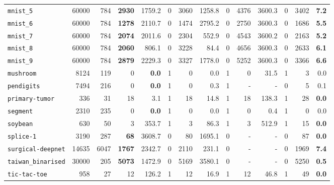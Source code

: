 \begin{tabular}{lccrrrrrrrrrrr}
\texttt{mnist\_5} & \multicolumn{1}{r}{60000} & \multicolumn{1}{r}{784}  & \textbf{2930} & 1759.2 & 0 & 3060 & 1258.8 & 0 & 4376 & 3600.3 & 0 & 3402 & \textbf{7.2}\\
\texttt{mnist\_6} & \multicolumn{1}{r}{60000} & \multicolumn{1}{r}{784}  & \textbf{1278} & 2110.7 & 0 & 1474 & 2795.2 & 0 & 2750 & 3600.3 & 0 & 1686 & \textbf{5.5}\\
\texttt{mnist\_7} & \multicolumn{1}{r}{60000} & \multicolumn{1}{r}{784}  & \textbf{2074} & 2011.6 & 0 & 2304 & 552.9 & 0 & 4543 & 3600.2 & 0 & 2163 & \textbf{5.2}\\
\texttt{mnist\_8} & \multicolumn{1}{r}{60000} & \multicolumn{1}{r}{784}  & \textbf{2060} & 806.1 & 0 & 3228 & 84.4 & 0 & 4656 & 3600.3 & 0 & 2633 & \textbf{6.1}\\
\texttt{mnist\_9} & \multicolumn{1}{r}{60000} & \multicolumn{1}{r}{784}  & \textbf{2879} & 2229.3 & 0 & 3327 & 1778.0 & 0 & 5252 & 3600.3 & 0 & 3366 & \textbf{6.6}\\
\texttt{mushroom} & \multicolumn{1}{r}{8124} & \multicolumn{1}{r}{119}  & 0 & \textbf{0.0} & 1 & 0 & 0.0 & 1 & 0 & 31.5 & 1 & 3 & 0.0\\
\texttt{pendigits} & \multicolumn{1}{r}{7494} & \multicolumn{1}{r}{216}  & 0 & \textbf{0.0} & 1 & 0 & 0.3 & 1 & - & - & 0 & 5 & 0.1\\
\texttt{primary-tumor} & \multicolumn{1}{r}{336} & \multicolumn{1}{r}{31}  & 18 & 3.1 & 1 & 18 & 14.8 & 1 & 18 & 138.3 & 1 & 28 & \textbf{0.0}\\
\texttt{segment} & \multicolumn{1}{r}{2310} & \multicolumn{1}{r}{235}  & 0 & \textbf{0.0} & 1 & 0 & 0.0 & 1 & 0 & 0.4 & 1 & 0 & 0.0\\
\texttt{soybean} & \multicolumn{1}{r}{630} & \multicolumn{1}{r}{50}  & 3 & 353.7 & 1 & 3 & 86.3 & 1 & 3 & 512.9 & 1 & 15 & \textbf{0.0}\\
\texttt{splice-1} & \multicolumn{1}{r}{3190} & \multicolumn{1}{r}{287}  & \textbf{68} & 3608.7 & 0 & 80 & 1695.1 & 0 & - & - & 0 & 87 & \textbf{0.0}\\
\texttt{surgical-deepnet} & \multicolumn{1}{r}{14635} & \multicolumn{1}{r}{6047}  & \textbf{1767} & 2342.7 & 0 & 2110 & 231.1 & 0 & - & - & 0 & 1969 & \textbf{7.4}\\
\texttt{taiwan\_binarised} & \multicolumn{1}{r}{30000} & \multicolumn{1}{r}{205}  & \textbf{5073} & 1472.9 & 0 & 5169 & 3580.1 & 0 & - & - & 0 & 5250 & \textbf{0.5}\\
\texttt{tic-tac-toe} & \multicolumn{1}{r}{958} & \multicolumn{1}{r}{27}  & 12 & 126.2 & 1 & 12 & 16.9 & 1 & 12 & 46.8 & 1 & 49 & \textbf{0.0}\\

\end{tabular}
